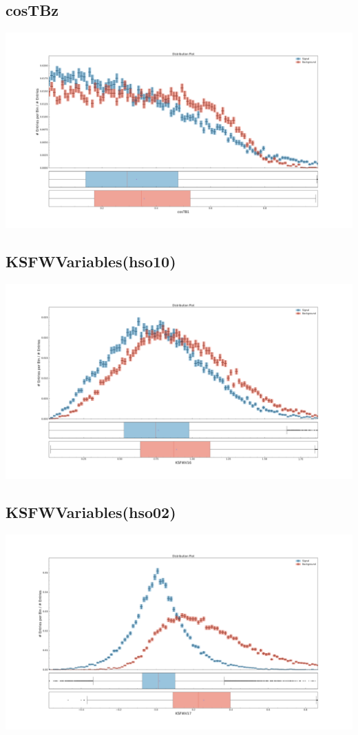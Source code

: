 \documentclass[10pt,a4paper]{article}
\begin{document}
\subsection{cosTBz}
\begin{center}
\includegraphics[width=1.0\textwidth]{variable_963037463308317558.pdf}
\end{center}
\subsection{KSFWVariables(hso10)}
\begin{center}
\includegraphics[width=1.0\textwidth]{variable_-1390686722545493757.pdf}
\end{center}
\subsection{KSFWVariables(hso02)}
\begin{center}
\includegraphics[width=1.0\textwidth]{variable_1029872470136689320.pdf}
\end{center}
\end{document}
